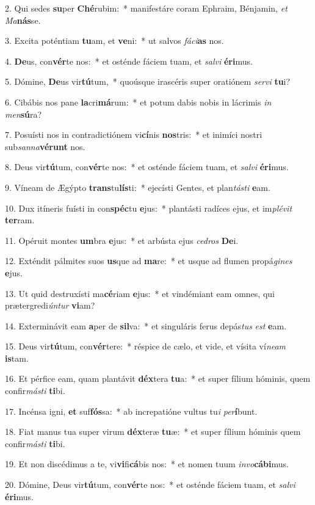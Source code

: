 2. Qui sedes \textbf{su}per \textbf{Ché}rubim:~*  manifestáre coram Ephraim, Bénjamin, \textit{et} \textit{Ma}\textbf{nás}se.\

3. Excita poténtiam \textbf{tu}am, et \textbf{ve}ni:~*  ut salvos \textit{fá}\textit{ci}\textbf{as} nos.\

4. \textbf{De}us, con\textbf{vér}te nos:~*  et osténde fáciem tuam, et \textit{sal}\textit{vi} \textbf{é}\textbf{ri}mus.\

5. Dómine, \textbf{De}us vir\textbf{tú}tum,~*  quoúsque irascéris super oratiónem \textit{ser}\textit{vi} \textbf{tu}i?\

6. Cibábis nos pane \textbf{la}cri\textbf{má}rum:~*  et potum dabis nobis in lácrimis \textit{in} \textit{men}\textbf{sú}ra?\

7. Posuísti nos in contradictiónem vi\textbf{cí}nis \textbf{nos}tris:~*  et inimíci nostri sub\textit{san}\textit{na}\textbf{vé}\textbf{runt} nos.\

8. Deus vir\textbf{tú}tum, con\textbf{vér}te nos:~*  et osténde fáciem tuam, et \textit{sal}\textit{vi} \textbf{é}\textbf{ri}mus.\

9. Víneam de Ægýpto \textbf{trans}tu\textbf{lís}ti:~*  ejecísti Gentes, et plan\textit{tás}\textit{ti} \textbf{e}am.\

10. Dux itíneris fuísti in con\textbf{spéc}tu \textbf{e}jus:~*  plantásti radíces ejus, et im\textit{plé}\textit{vit} \textbf{ter}ram.\

11. Opéruit montes \textbf{um}bra \textbf{e}jus:~*  et arbústa ejus \textit{ce}\textit{dros} \textbf{De}i.\

12. Exténdit pálmites suos \textbf{us}que ad \textbf{ma}re:~*  et usque ad flumen propá\textit{gi}\textit{nes} \textbf{e}jus.\

13. Ut quid destruxísti ma\textbf{cé}riam \textbf{e}jus:~*  et vindémiant eam omnes, qui prætergredi\textit{ún}\textit{tur} \textbf{vi}am?\

14. Exterminávit eam \textbf{a}per de \textbf{sil}va:~*  et singuláris ferus depás\textit{tus} \textit{est} \textbf{e}am.\

15. Deus vir\textbf{tú}tum, con\textbf{vér}tere:~*  réspice de cælo, et vide, et vísita ví\textit{ne}\textit{am} \textbf{is}tam.\

16. Et pérfice eam, quam plantávit \textbf{déx}tera \textbf{tu}a:~*  et super fílium hóminis, quem confir\textit{más}\textit{ti} \textbf{ti}bi.\

17. Incénsa igni, \textbf{et} suf\textbf{fós}sa:~*  ab increpatióne vultus tu\textit{i} \textit{per}\textbf{í}bunt.\

18. Fiat manus tua super virum \textbf{déx}teræ \textbf{tu}æ:~*  et super fílium hóminis quem confir\textit{más}\textit{ti} \textbf{ti}bi.\

19. Et non discédimus a te, vi\textbf{vi}fi\textbf{cá}bis nos:~*  et nomen tuum \textit{in}\textit{vo}\textbf{cá}\textbf{bi}mus.\

20. Dómine, Deus vir\textbf{tú}tum, con\textbf{vér}te nos:~*  et osténde fáciem tuam, et \textit{sal}\textit{vi} \textbf{é}\textbf{ri}mus.\

